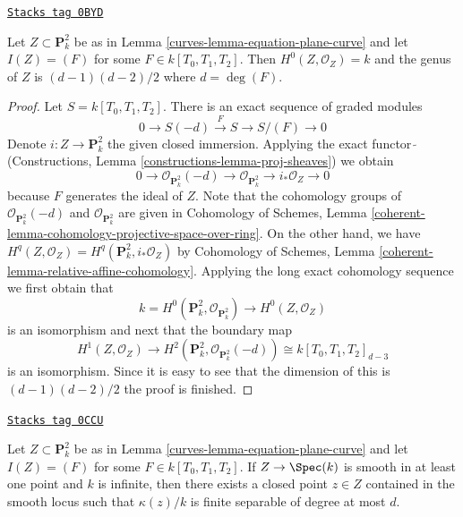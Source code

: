 \begin{lemma}
\label{curves-lemma-genus-plane-curve}
\href{https://stacks.math.columbia.edu/tag/0BYD}{\texttt{Stacks tag 0BYD}}

Let $Z \subset \mathbf{P}^2_k$ be as in Lemma \ref{curves-lemma-equation-plane-curve}
and let $I(Z) = (F)$ for some $F \in k[T_0, T_1, T_2]$.
Then $H^0(Z, \mathcal{O}_Z) = k$ and the genus of $Z$ is
$(d - 1)(d - 2)/2$ where $d = \deg(F)$.
\end{lemma}

\begin{proof}
Let $S = k[T_0, T_1, T_2]$.
There is an exact sequence of graded modules
$$
0 \to S(-d) \xrightarrow{F} S \to S/(F) \to 0
$$
Denote $i : Z \to \mathbf{P}^2_k$ the given closed immersion.
Applying the exact functor $\widetilde{\ }$
(Constructions, Lemma \ref{constructions-lemma-proj-sheaves})
we obtain
$$
0 \to \mathcal{O}_{\mathbf{P}^2_k}(-d) \to
\mathcal{O}_{\mathbf{P}^2_k} \to i_*\mathcal{O}_Z \to 0
$$
because $F$ generates the ideal of $Z$.
Note that the cohomology groups of $\mathcal{O}_{\mathbf{P}^2_k}(-d)$ and
$\mathcal{O}_{\mathbf{P}^2_k}$ are given in
Cohomology of Schemes, Lemma
\ref{coherent-lemma-cohomology-projective-space-over-ring}.
On the other hand, we have
$H^q(Z, \mathcal{O}_Z) = H^q(\mathbf{P}^2_k, i_*\mathcal{O}_Z)$ by
Cohomology of Schemes, Lemma \ref{coherent-lemma-relative-affine-cohomology}.
Applying the long exact cohomology sequence
we first obtain that
$$
k = H^0(\mathbf{P}^2_k, \mathcal{O}_{\mathbf{P}^2_k}) \longrightarrow
H^0(Z, \mathcal{O}_Z)
$$
is an isomorphism and next that the boundary map
$$
H^1(Z, \mathcal{O}_Z) \longrightarrow
H^2(\mathbf{P}^2_k, \mathcal{O}_{\mathbf{P}^2_k}(-d)) \cong
k[T_0, T_1, T_2]_{d - 3}
$$
is an isomorphism. Since it is easy to see that the dimension of this
is $(d - 1)(d - 2)/2$ the proof is finished.
\end{proof}

\begin{lemma}
\label{curves-lemma-smooth-plane-curve-point-over-separable}
\href{https://stacks.math.columbia.edu/tag/0CCU}{\texttt{Stacks tag 0CCU}}

Let $Z \subset \mathbf{P}^2_k$ be as in Lemma \ref{curves-lemma-equation-plane-curve}
and let $I(Z) = (F)$ for some $F \in k[T_0, T_1, T_2]$.
If $Z \to \Spec(k)$ is smooth in at least one point and $k$ is infinite, then
there exists a closed point $z \in Z$ contained in the smooth
locus such that $\kappa(z)/k$ is finite separable of degree
at most $d$.
\end{lemma}

